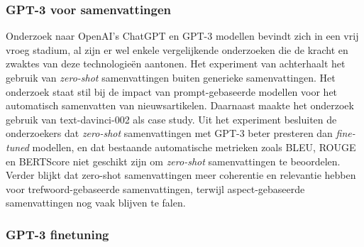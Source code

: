 

\subsubsection{GPT-3 voor samenvattingen}




Onderzoek naar OpenAI's ChatGPT en GPT-3 modellen bevindt zich in een vrij vroeg stadium, al zijn er wel enkele vergelijkende onderzoeken die de kracht en zwaktes van deze technologieën aantonen. Het experiment van \textcite{Goyal2022} achterhaalt het gebruik van \textit{zero-shot} samenvattingen buiten generieke samenvattingen. Het onderzoek staat stil bij de impact van prompt-gebaseerde modellen voor het automatisch samenvatten van nieuwsartikelen. Daarnaast maakte het onderzoek gebruik van text-davinci-002 als case study. Uit het experiment besluiten de onderzoekers dat \textit{zero-shot} samenvattingen met GPT-3 beter presteren dan \textit{fine-tuned} modellen, en dat bestaande automatische metrieken zoals BLEU, ROUGE en BERTScore niet geschikt zijn om \textit{zero-shot} samenvattingen te beoordelen. Verder blijkt dat zero-shot samenvattingen meer coherentie en relevantie hebben voor trefwoord-gebaseerde samenvattingen, terwijl aspect-gebaseerde samenvattingen nog vaak blijven te falen.




\subsubsection{GPT-3 finetuning}

